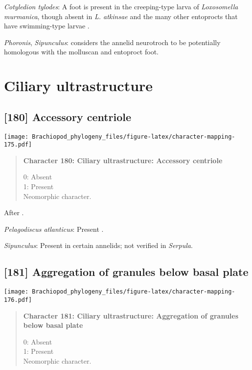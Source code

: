 \documentclass[openany]{book}
\theoremstyle{definition}
\theoremstyle{definition}
\theoremstyle{definition}
\theoremstyle{remark}
\begin{document}
\hypertarget{Cotyledion_tylodes-coding-179}{}
\emph{Cotyledion tylodes}: A foot is present in the creeping-type larva
of \emph{Loxosomella} \emph{murmanica}, though absent in \emph{L.
atkinsae} and the many other entoprocts that have swimming-type larvae
\citep{Fuchs2008}.

\hypertarget{Phoronis-coding-179}{}
\emph{Phoronis}, \emph{Sipunculus}: \citet{Wingstrand1985} considers the
annelid neurotroch to be potentially homologous with the molluscan and
entoproct foot.

\section{Ciliary ultrastructure}\label{ciliary-ultrastructure}

\subsection*{{[}180{]} Accessory centriole}\label{accessory-centriole}

\texttt{[image: Brachiopod\_phylogeny\_files/figure-latex/character-mapping-175.pdf]}

\begin{quote}
\textbf{Character 180: Ciliary ultrastructure: Accessory centriole}

0: Absent\\
1: Present\\
Neomorphic character.
\end{quote}

After \citet{Lundin2009}.

\hypertarget{Pelagodiscus_atlanticus-coding-180}{}
\emph{Pelagodiscus atlanticus}: Present \citep{Luter1995}.

\hypertarget{Sipunculus-coding-180}{}
\emph{Sipunculus}: Present in certain annelids; not verified in
\emph{Serpula}.

\subsection*{{[}181{]} Aggregation of granules below basal
plate}\label{aggregation-of-granules-below-basal-plate}

\texttt{[image: Brachiopod\_phylogeny\_files/figure-latex/character-mapping-176.pdf]}

\begin{quote}
\textbf{Character 181: Ciliary ultrastructure: Aggregation of granules
below basal plate}

0: Absent\\
1: Present\\
Neomorphic character.
\end{quote}
\end{document}
